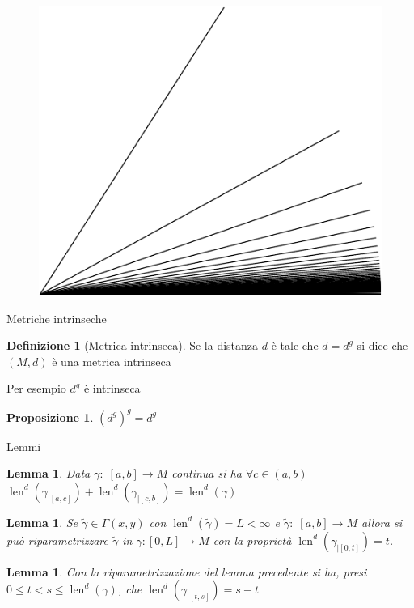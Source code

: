 \documentclass{beamer}
\newcounter{counter1}
\theoremstyle{plain}
\newtheorem{mylem}[counter1]{Lemma}
\newtheorem{mypro}[counter1]{Proposizione}
\theoremstyle{definition}
\newtheorem{mydef}[counter1]{Definizione}
\theoremstyle{remark}
\newcommand{\pa}[1]{\left(#1\right)}
\newcommand{\bra}[1]{\left[#1\right]}
\DeclareMathOperator{\len}{len}
\begin{document}
\begin{frame}
  \begin{figure}[h]
    \includegraphics[scale=1]{noncompattogeodetiche.pdf}
  \end{figure}
\end{frame}

\begin{frame}{Metriche intrinseche}
  \begin{mydef}[Metrica intrinseca]
    Se la distanza $d$ è tale che $d = d^g$ si dice che $(M,d)$ è una
    metrica intrinseca
  \end{mydef}

  Per esempio $d^g$ è intrinseca
  \begin{mypro}
    $\pa{d^g}^g = d^g$
  \end{mypro}
\end{frame}

\begin{frame}{Lemmi}
  \begin{mylem}
    Data $\gamma:\; \bra{a,b} \to M$ continua si ha $\forall c \in
    \pa{a,b}$ $\len ^d (\gamma_{|\bra{a,c}}) +  \len ^d (\gamma_{|\bra{c,b}}) = 
    \len ^d (\gamma)$
  \end{mylem}
  \begin{mylem}
    Se $\tilde \gamma \in \Gamma (x,y)$ con $\len ^d (\tilde \gamma) = L
    < \infty$ e $\tilde \gamma : \; \bra {a,b} \to M$ allora si può
    riparametrizzare $\tilde \gamma$ in $\gamma : \bra{0,L} \to M$ con la
    proprietà $\len ^d(\gamma_{| \bra{0,t}}) = t$.
  \end{mylem}
  \begin{mylem}
    Con la riparametrizzazione del lemma precedente si ha, presi $0 \le
    t < s \le \len ^d (\gamma)$, che $\len ^d (\gamma _{|\bra{t,s}}) = s - t$
  \end{mylem}
\end{frame}
\end{document}
